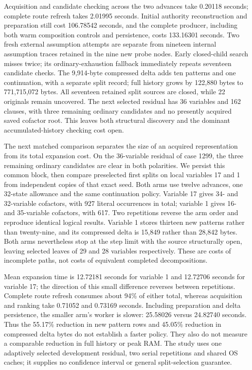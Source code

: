 \documentclass[11pt,a4paper]{article}
\numberwithin{equation}{section}
\theoremstyle{plain}
\theoremstyle{definition}
\theoremstyle{remark}
\begin{document}
Acquisition and candidate checking across the two advances take 0.20118 seconds; complete route refresh takes 2.01995 seconds. Initial authority reconstruction and preparation still cost 106.78542 seconds, and the complete producer, including both warm composition controls and persistence, costs 133.16301 seconds. Two fresh external assumption attempts are separate from nineteen internal assumption traces retained in the nine new probe nodes. Early closed-child search misses twice; its ordinary-exhaustion fallback immediately repeats seventeen candidate checks. The 9,914-byte compressed delta adds ten patterns and one continuation, with a separate split record; full history grows by 122,880 bytes to 771,715,072 bytes. All seventeen retained split sources are closed, while 22 originals remain uncovered. The next selected residual has 36 variables and 162 clauses, with three remaining ordinary candidates and no presently acquired saved cofactor root. This leaves both structural discovery and the dominant accumulated-history checking cost open.

The next matched comparison separates the size of an acquired representation from its total expansion cost. On the 36-variable residual of case 1299, the three remaining ordinary candidates are clear in both polarities. We persist this common block, then compare preselected first splits on local variables 17 and 1 from independent copies of that exact seed. Both arms use twelve advances, one 32-state allowance and the same continuation policy. Variable 17 gives 34- and 32-variable cofactors, with 927 literal occurrences in total; variable 1 gives 16- and 35-variable cofactors, with 617. Two repetitions reverse the arm order and reproduce identical logical results. Variable 1 stores thirteen new patterns rather than twenty-nine, and its compressed delta is 15,849 rather than 28,842 bytes. Both arms nevertheless stop at the step limit with the source structurally open, leaving selected leaves of 29 and 28 variables respectively. These are costs of incomplete paths, not costs of equivalent completed decompositions.

Mean expansion time is 12.72181 seconds for variable 1 and 12.72706 seconds for variable 17; the direction of this small difference reverses between repetitions. Complete route refresh consumes about 94\% of either total, whereas acquisition and ranking take 0.71052 and 0.73169 seconds. Including preparation and delta persistence, the smaller arm's worker is slower: 25.58026 versus 24.82740 seconds. Thus the 55.17\% reduction in new pattern rows and 45.05\% reduction in compressed delta bytes do not establish a faster policy. They also do not measure a comparable reduction in full history or peak RAM. The study uses one adaptively selected development residual, two serial repetitions and shared OS caches; it supplies no confidence interval or general split-selection guarantee.
\end{document}
